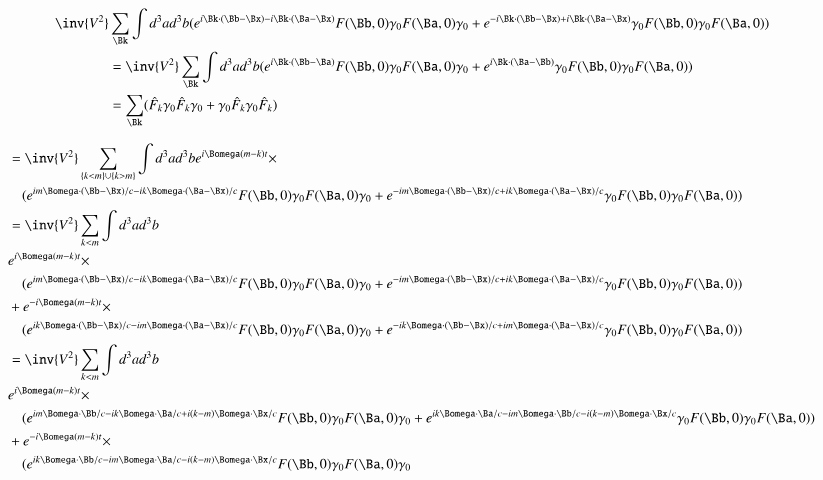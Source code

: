 \begin{align*}
\inv{V^2} &\sum_{\Bk} \int d^3 a d^3 b (e^{   i \Bk \cdot (\Bb-\Bx) - i \Bk \cdot (\Ba-\Bx) } F(\Bb, 0) \gamma_0 F(\Ba, 0) \gamma_0
+e^{ - i \Bk \cdot (\Bb-\Bx) + i \Bk \cdot (\Ba-\Bx) } \gamma_0 F(\Bb, 0) \gamma_0 F(\Ba, 0)) \\
&=
\inv{V^2} \sum_{\Bk} \int d^3 a d^3 b (e^{   i \Bk \cdot (\Bb - \Ba) } F(\Bb, 0) \gamma_0 F(\Ba, 0) \gamma_0
+e^{ i \Bk \cdot (\Ba -\Bb) } \gamma_0 F(\Bb, 0) \gamma_0 F(\Ba, 0)) \\
&=
\sum_{\Bk} ( \hat{F}_k \gamma_0 \hat{F}_k \gamma_0 + \gamma_0 \hat{F}_k \gamma_0 \hat{F}_k ) \\
\end{align*}


\begin{align*}
&=\inv{V^2} \sum_{\{k <m\} \cup \{ k > m \}} \int d^3 a d^3 b e^{i \Bomega (m -k) t } \times \\
&\quad (e^{   i m \Bomega \cdot (\Bb-\Bx)/c - i k \Bomega \cdot (\Ba-\Bx)/c } F(\Bb, 0) \gamma_0 F(\Ba, 0) \gamma_0
+e^{ - i m \Bomega \cdot (\Bb-\Bx)/c + i k \Bomega \cdot (\Ba-\Bx)/c } \gamma_0 F(\Bb, 0) \gamma_0 F(\Ba, 0)) \\
&=\inv{V^2} \sum_{ k <m } \int d^3 a d^3 b \\
&e^{i \Bomega (m -k) t } \times \\
&\quad (e^{   i m \Bomega \cdot (\Bb-\Bx)/c - i k \Bomega \cdot (\Ba-\Bx)/c } F(\Bb, 0) \gamma_0 F(\Ba, 0) \gamma_0
+e^{ - i m \Bomega \cdot (\Bb-\Bx)/c + i k \Bomega \cdot (\Ba-\Bx)/c } \gamma_0 F(\Bb, 0) \gamma_0 F(\Ba, 0)) \\
&+e^{-i \Bomega (m -k) t } \times \\
&\quad (e^{   i k \Bomega \cdot (\Bb-\Bx)/c - i m \Bomega \cdot (\Ba-\Bx)/c } F(\Bb, 0) \gamma_0 F(\Ba, 0) \gamma_0
+e^{ - i k \Bomega \cdot (\Bb-\Bx)/c + i m \Bomega \cdot (\Ba-\Bx)/c } \gamma_0 F(\Bb, 0) \gamma_0 F(\Ba, 0)) \\
&=\inv{V^2} \sum_{ k <m } \int d^3 a d^3 b \\
&e^{i \Bomega (m -k) t } \times \\
&\quad (e^{   i m \Bomega \cdot \Bb/c - i k \Bomega \cdot \Ba/c + i (k-m) \Bomega \cdot \Bx/c } F(\Bb, 0) \gamma_0 F(\Ba, 0) \gamma_0
+e^{ i k \Bomega \cdot \Ba/c - i m \Bomega \cdot \Bb/c - i (k -m) \Bomega \cdot \Bx/c } \gamma_0 F(\Bb, 0) \gamma_0 F(\Ba, 0)) \\
&+e^{-i \Bomega (m -k) t } \times \\
&\quad (e^{   i k \Bomega \cdot \Bb/c - i m \Bomega \cdot \Ba/c -i (k-m) \Bomega \cdot \Bx/c } F(\Bb, 0) \gamma_0 F(\Ba, 0) \gamma_0

\end{align*}
